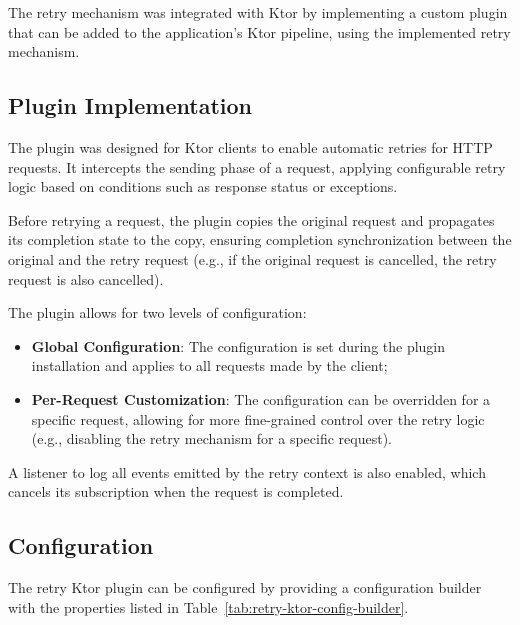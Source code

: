 The retry mechanism was integrated with Ktor
by implementing a custom plugin that can be added to the application's Ktor pipeline,
using the implemented retry mechanism.

\subsection{Plugin Implementation}\label{subsec:request-retry-plugin}

The plugin was designed for Ktor clients to enable automatic retries for HTTP requests.
It intercepts the sending phase of a request,
applying configurable retry logic based on conditions such as response status or exceptions.

Before retrying a request,
the plugin copies the original request and propagates its completion state to the copy,
ensuring completion synchronization between the original and the retry request (e.g., if the original request is cancelled, the retry request is also cancelled).

The plugin allows for two levels of configuration:

\begin{itemize}
    \item \textbf{Global Configuration}: The configuration is set during the plugin installation and applies to all requests made by the client;
    \item \textbf{Per-Request Customization}: The configuration can be overridden for a specific request, allowing for more fine-grained control over the retry logic (e.g., disabling the retry mechanism for a specific request).
\end{itemize}

A listener to log all events emitted by the retry context is also enabled, which cancels its subscription when the request is completed.

\subsection{Configuration}\label{subsec:retry-ktor-configuration}

The retry Ktor plugin can be configured by providing a configuration builder with the properties listed in Table~\ref{tab:retry-ktor-config-builder}.

